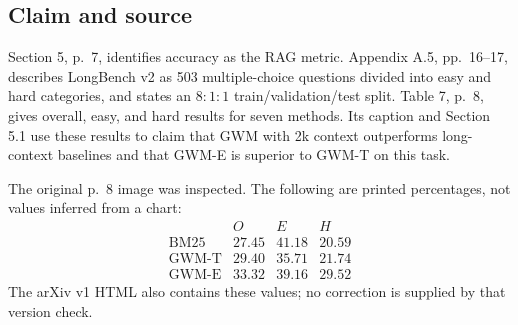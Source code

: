 \documentclass[10pt]{article}
\begin{document}
\subsection*{Claim and source}
Section 5, p. 7, identifies accuracy as the RAG metric. Appendix A.5, pp. 16–17, describes LongBench v2 as 503 multiple-choice questions divided into easy and hard categories, and states an \(8{:}1{:}1\) train/validation/test split. Table 7, p. 8, gives overall, easy, and hard results for seven methods. Its caption and Section 5.1 use these results to claim that GWM with 2k context outperforms long-context baselines and that GWM-E is superior to GWM-T on this task.\par
The original p. 8 image was inspected. The following are printed percentages, not values inferred from a chart: \[\begin{array}{c|rrr}
 & O & E & H\\ \hline
 \mathrm{BM25}&27.45&41.18&20.59\\
 \mathrm{GWM\text{-}T}&29.40&35.71&21.74\\
 \mathrm{GWM\text{-}E}&33.32&39.16&29.52
\end{array}\] The arXiv v1 HTML also contains these values; no correction is supplied by that version check.\par
\end{document}
